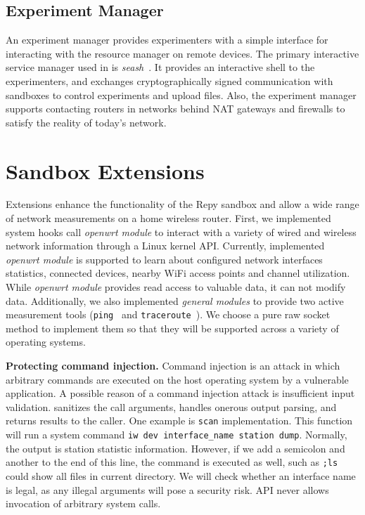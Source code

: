 \subsection{Experiment Manager}
\label{sec.seash}
An experiment manager provides experimenters with a simple interface for interacting with the resource manager on remote devices. The primary interactive service manager used in \sysname is \textit{seash}~\cite{seash}. It provides an interactive shell to the experimenters, and exchanges cryptographically signed communication with sandboxes to control experiments and upload files. Also, the experiment manager supports contacting routers in networks behind NAT gateways and firewalls to satisfy the reality of today's network.

\section{Sandbox Extensions}
\label{sec.extensions}
Extensions enhance the functionality of the Repy sandbox and allow a wide range of network measurements on a home wireless router. First, we implemented system hooks call \textit{openwrt module} to interact with a variety of wired and wireless network information through a Linux kernel API. Currently, implemented \textit{openwrt module} is supported to learn about configured network interfaces statistics, connected devices, nearby WiFi access points and channel utilization. While \textit{openwrt module} provides read access to valuable data, it can not modify data. Additionally, we also implemented \textit{general modules} to provide two active measurement tools (\texttt{ping}~\cite{pingcode} and \texttt{traceroute}~\cite{traceroutecode}). We choose a pure raw socket method to implement them so that they will be supported across a variety of operating systems. 

\textbf{Protecting command injection.} Command injection is an attack in which arbitrary commands are executed on the host operating system by a vulnerable application. A possible reason of a command injection attack is insufficient input validation. \sysname sanitizes the call arguments, handles onerous output parsing, and returns results to the caller. One example is \texttt{scan} implementation. This function will run a system command \texttt{iw dev interface\_name station dump}. Normally, the output is station statistic information. However, if we add a semicolon and another to the end of this line, the command is executed as well, such as \texttt{;ls} could show all files in current directory. We will check whether an interface name is legal, as any illegal arguments will pose a security risk. \sysname API never allows invocation of arbitrary system calls.

